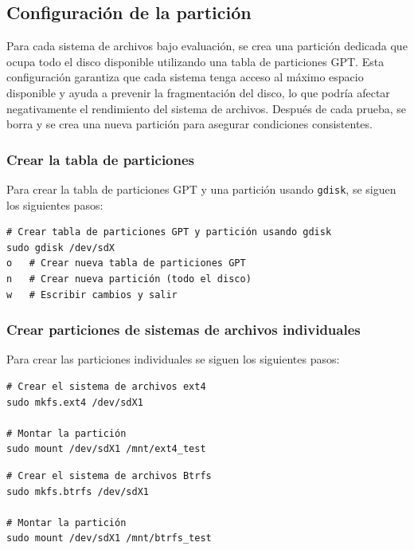 \subsection{Configuración de la partición}

Para cada sistema de archivos bajo evaluación, se crea una partición dedicada que ocupa todo el disco disponible utilizando una tabla de particiones GPT. Esta configuración garantiza que cada sistema tenga acceso al máximo espacio disponible y ayuda a prevenir la fragmentación del disco, lo que podría afectar negativamente el rendimiento del sistema de archivos. Después de cada prueba, se borra y se crea una nueva partición para asegurar condiciones consistentes.

\subsubsection{Crear la tabla de particiones}

Para crear la tabla de particiones GPT y una partición usando \texttt{gdisk}, se siguen los siguientes pasos:

\begin{tcolorbox}[title=Comandos para crear la tabla de particiones GPT]
\begin{verbatim}
# Crear tabla de particiones GPT y partición usando gdisk
sudo gdisk /dev/sdX
o   # Crear nueva tabla de particiones GPT
n   # Crear nueva partición (todo el disco)
w   # Escribir cambios y salir
\end{verbatim}
\end{tcolorbox}

\subsubsection{Crear particiones de sistemas de archivos individuales}
Para crear las particiones individuales se siguen los siguientes pasos:

\begin{tcolorbox}[title=Comandos para ext4]
\begin{verbatim}
# Crear el sistema de archivos ext4
sudo mkfs.ext4 /dev/sdX1

# Montar la partición
sudo mount /dev/sdX1 /mnt/ext4_test
\end{verbatim}
\end{tcolorbox}

\begin{tcolorbox}[title=Comandos para Btrfs]
\begin{verbatim}
# Crear el sistema de archivos Btrfs
sudo mkfs.btrfs /dev/sdX1

# Montar la partición
sudo mount /dev/sdX1 /mnt/btrfs_test
\end{verbatim}
\end{tcolorbox}

